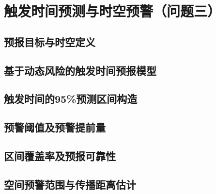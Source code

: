 \section{触发时间预测与时空预警（问题三）}\label{sec:warning}

\subsection{预报目标与时空定义}\label{sec:forecast-target}
\writingplaceholder

\subsection{基于动态风险的触发时间预报模型}\label{sec:time-forecast}
\writingplaceholder

\subsection{触发时间的95\%预测区间构造}\label{sec:prediction-interval}
\writingplaceholder

\subsection{预警阈值及预警提前量}\label{sec:alarm-lead-time}
\writingplaceholder

\subsection{区间覆盖率及预报可靠性}\label{sec:interval-coverage}
\writingplaceholder

\subsection{空间预警范围与传播距离估计}\label{sec:warning-extent}
\writingplaceholder
